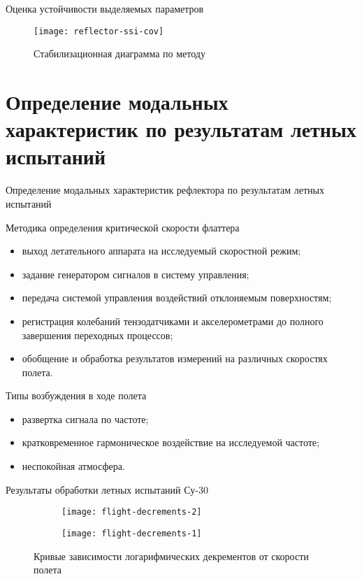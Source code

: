 \begin{frame}{Оценка устойчивости выделяемых параметров}
	\begin{figure}
		\centering
		\texttt{[image: reflector-ssi-cov]}
		\caption{Стабилизационная диаграмма по методу }
	\end{figure}
\end{frame}

\section{Определение модальных характеристик по результатам летных испытаний}

\begin{frame}{Определение модальных характеристик рефлектора по результатам летных испытаний}
	\begin{block}{Методика определения критической скорости флаттера}
		\begin{itemize}
			\item выход летательного аппарата на исследуемый скоростной режим;
			\item задание генератором сигналов в систему управления; 
			\item передача системой управления воздействий отклоняемым поверхностям;
			\item регистрация колебаний тензодатчиками и акселерометрами до полного завершения переходных процессов;
			\item обобщение и обработка результатов измерений на различных скоростях полета.
		\end{itemize}
	\end{block}
	\begin{block}{Типы возбуждения в ходе полета}
		\begin{itemize}
			\item развертка сигнала по частоте; 
			\item кратковременное гармоническое воздействие на исследуемой частоте; 
			\item неспокойная атмосфера.
		\end{itemize}
	\end{block}
\end{frame}

\begin{frame}{Результаты обработки летных испытаний Су-30}
	\begin{figure}
		\begin{subfigure}[b]{0.49\textwidth}
			\centering
	     	\texttt{[image: flight-decrements-2]} 
	    \end{subfigure}
    	\hfill
	    \begin{subfigure}[b]{0.49\textwidth}
			\centering
			\texttt{[image: flight-decrements-1]}
	    \end{subfigure}
    	\caption{Кривые зависимости логарифмических декрементов от скорости полета}
	\end{figure}
\end{frame}

